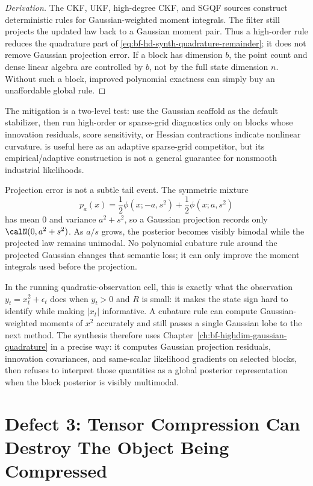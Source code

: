 \begin{proof}[Derivation]
The CKF, UKF, high-degree CKF, and SGQF sources
\citep{julier1997new,arasaratnam2009cubature,jia2012sparsegrid,jia2013highdegree}
construct deterministic rules for Gaussian-weighted moment integrals.  The
filter still projects the updated law back to a Gaussian moment pair.  Thus a
high-order rule reduces the quadrature part of
\eqref{eq:bf-hd-synth-quadrature-remainder}; it does not remove Gaussian
projection error.  If a block has dimension \(b\), the point count and dense
linear algebra are controlled by \(b\), not by the full state dimension \(n\).
Without such a block, improved polynomial exactness can simply buy an
unaffordable global rule.
\end{proof}

The mitigation is a two-level test: use the Gaussian scaffold as the default
stabilizer, then run high-order or sparse-grid diagnostics only on blocks whose
innovation residuals, score sensitivity, or Hessian contractions indicate
nonlinear curvature.  \citet{singh2018adaptive} is useful here as an adaptive
sparse-grid competitor, but its empirical/adaptive construction is not a
general guarantee for nonsmooth industrial likelihoods.

Projection error is not a subtle tail event.  The symmetric mixture
\[
  p_a(x)=\frac12\phi(x;-a,s^2)+\frac12\phi(x;a,s^2)
\]
has mean \(0\) and variance \(a^2+s^2\), so a Gaussian projection records only
\(\calN(0,a^2+s^2)\).  As \(a/s\) grows, the posterior becomes visibly
bimodal while the projected law remains unimodal.  No polynomial cubature rule
around the projected Gaussian changes that semantic loss; it can only improve
the moment integrals used before the projection.

In the running quadratic-observation cell, this is exactly what the observation
\(y_t=x_t^2+\epsilon_t\) does when \(y_t>0\) and \(R\) is small: it makes the
state sign hard to identify while making \(|x_t|\) informative.  A cubature
rule can compute Gaussian-weighted moments of \(x^2\) accurately and still
passes a single Gaussian lobe to the next method.  The synthesis therefore
uses Chapter~\ref{ch:bf-highdim-gaussian-quadrature} in a precise way: it
computes Gaussian projection residuals, innovation covariances, and
same-scalar likelihood gradients on selected blocks, then refuses to interpret
those quantities as a global posterior representation when the block posterior
is visibly multimodal.

\section[Tensor Compression Defects]{Defect 3: Tensor Compression Can Destroy The Object Being Compressed}
\label{sec:bf-hd-defect-tensor}

